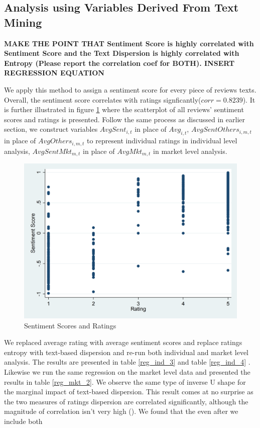 \documentclass[msom,blindrev]{informs3}
\begin{document}
\subsection{Analysis using Variables Derived From Text Mining}

\textbf{
MAKE THE POINT THAT Sentiment Score is highly correlated with Sentiment Score and the Text Dispersion is highly correlated with Entropy (Please report the correlation coef for BOTH).
INSERT REGRESSION EQUATION
}


We apply this method to assign a sentiment score for every piece of reviews texts. Overall, the sentiment score correlates with ratings signficantly($corr = 0.8239$). It is further illustrated in figure \ref{sent_score_scatter} where the scatterplot of all reviews' sentiment scores and ratings is presented.  Follow the same process as discussed in earlier section, we construct variables $AvgSent_{i,t}$ in place of $Avg_{i,t}$, $AvgSentOthers_{i,m,t}$ in place of $AvgOthers_{i,m,t}$ to represent individual ratings in individual level analysis, $AvgSentMkt_{m,t}$ in place of $AvgMkt_{m,t}$ in market level analysis.
\begin{figure}
	\centering
	\includegraphics[width=0.7\linewidth]{sent_score_scatter.png}
	\caption{Sentiment Scores and Ratings}
	\label{sent_score_scatter}
\end{figure}



We replaced average rating with average sentiment scores and replace ratings entropy with text-based dispersion and re-run both individual and market level analysis. The results are presented in table \ref{reg_ind_3} and table \ref{reg_ind_4} . Likewise we run the same regression on the market level data and presented the results in table \ref{reg_mkt_2}. We observe the same type of inverse U shape for the marginal impact of text-based dispersion. This result comes at no surprise as the two measures of ratings dispersion are correlated significantly, although the magnitude of correlation isn't very high ().  We found that the even after we include both  \\
\end{document}
